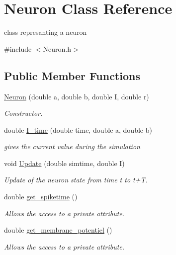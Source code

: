\hypertarget{classNeuron}{\section{Neuron Class Reference}
\label{classNeuron}
}


class represanting a neuron  




{\ttfamily \#include $<$Neuron.\-h$>$}

\subsection*{Public Member Functions}
\begin{DoxyCompactItemize}
\item 
\hyperlink{classNeuron_ad2cbca7e3c44734701ba87af6bd6824c}{Neuron} (double a, double b, double I, double r)
\begin{DoxyCompactList}\small\item\em Constructor. \end{DoxyCompactList}\item 
double \hyperlink{classNeuron_a753989d70b673c960b4a590c8302b5f3}{I\-\_\-time} (double time, double a, double b)
\begin{DoxyCompactList}\small\item\em gives the current value during the simulation \end{DoxyCompactList}\item 
void \hyperlink{classNeuron_a0950ac31ae1bbb3ed3d4bcb787c66e78}{Update} (double simtime, double I)
\begin{DoxyCompactList}\small\item\em Update of the neuron state from time t to t+\-T. \end{DoxyCompactList}\item 
double \hyperlink{classNeuron_ad501266805bd758f440a91fd4f48f276}{get\-\_\-spiketime} ()
\begin{DoxyCompactList}\small\item\em Allows the access to a private attribute. \end{DoxyCompactList}\item 
double \hyperlink{classNeuron_ae1d8f143ca337f9d37ef05c3978b46c7}{get\-\_\-membrane\-\_\-potentiel} ()
\begin{DoxyCompactList}\small\item\em Allows the access to a private attribute. \end{DoxyCompactList}\item 

\end{DoxyCompactItemize}
